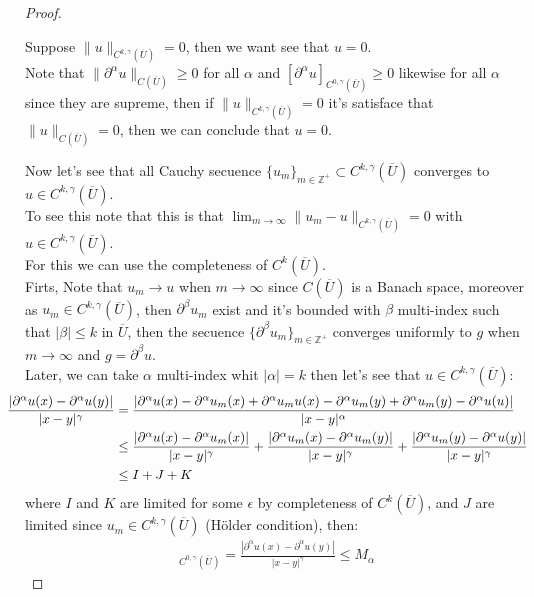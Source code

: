 \begin{proof}
\begin{itemize}
      Suppose $\|u\|_{C^{k,\gamma}(\overline{U})}=0$, then we want see that $u=0$.\\
      Note that $\|\partial^{\alpha}u\|_{C(\overline{U})}\geq0$ for all $\alpha$ and $[\partial^{\alpha}u]_{C^{0,\gamma}(\overline{U})}\geq 0$ likewise for all $\alpha$ since they are supreme, then if $\|u\|_{C^{k,\gamma}(\overline{U})}=0$ it's satisface that $\|u\|_{C(\overline{U})}=0$, then we can conclude that $u=0$.
  \end{itemize}
  Now let's see that all Cauchy secuence $\{u_m\}_{m\in\mathbb{Z}^{+}}\subset C^{k,\gamma}(\overline{U})$ converges to $u\in C^{k,\gamma}(\overline{U})$.\\
  To see this note that this is that $\lim_{m \rightarrow \infty}\|u_m-u\|_{C^{k,\gamma}(\overline{U})}=0$ with $u\in C^{k,\gamma}(\overline{U})$.\\
  For this we can use the completeness of $C^{k}(\overline{U})$.\\
  Firts, Note that $u_m\to u$ when $m\to\infty$ since $C(\overline{U})$ is a Banach space, moreover as $u_m\in C^{k,\gamma}(\overline{U})$, then $\partial^{\beta}u_m$ exist and it's bounded with $\beta$ multi-index such that $|\beta|\leq k$ in $\overline{U}$, then the secuence $\{\partial^{\beta}u_m\}_{m\in \mathbb{Z}^{+}}$ converges uniformly to $g$ when $m\to\infty$  and $g=\partial^{\beta}u$.\\ 
  Later, we can take $\alpha$ multi-index whit $|\alpha|=k$ then let's see that $u\in C^{k,\gamma}(\overline{U})$:
  \begin{align*}
    \hspace{-0.5cm}\frac{|\partial^{\alpha}u(x)-\partial^{\alpha}u(y)|}{|x-y|^{\gamma}}&=\frac{|\partial^{\alpha}u(x)-\partial^{\alpha}u_{m}(x)+\partial^{\alpha}u_{m}u(x)-\partial^{\alpha}u_{m}(y)+\partial^{\alpha}u_{m}(y)-\partial^{\alpha}u(u)|}{|x-y|^{\alpha}}\\
    &\leq \frac{|\partial^{\alpha}u(x)-\partial^{\alpha}u_{m}(x)|}{|x-y|^{\gamma}}+\frac{|\partial^{\alpha}u_{m}(x)-\partial^{\alpha}u_{m}(y)|}{|x-y|^{\gamma}}+\frac{|\partial^{\alpha}u_{m}(y)-\partial^{\alpha}u(y)|}{|x-y|^{\gamma}}\\
    &\leq I + J + K
  \end{align*}
  where $I$ and $K$ are limited for some $\epsilon$ by completeness of $C^{k}(\overline{U})$, and $J$ are limited since $u_m\in C^{k,\gamma}(\overline{U})$ (Hölder condition), then:
  \begin{align*}
    [\partial^{\alpha}u]_{C^{0,\gamma}(\overline{U})}=\frac{|\partial^{\alpha}u(x)-\partial^{\alpha}u(y)|}{|x-y|^{\gamma}}\leq M_{\alpha}

\end{align*}
\end{proof}
